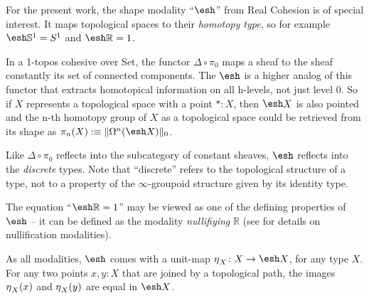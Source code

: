 \documentclass[9pt,twosided]{amsart}
\newcommand{\shape}{\ensuremath{\mathord{\raisebox{0.5pt}{\text{\rm\esh}}}}}
\newcommand{\bR}{\mathbb R}
\newcommand{\bS}{\mathbb S}
\begin{document}
For the present work, the shape modality ``$\shape$'' from Real Cohesion is of special interest.
It maps topological spaces to their \emph{homotopy type}, so for example $\shape \bS^{1} =\sphere{1}$ 
and $\shape \bR =1$.


In a 1-topos cohesive over Set, the functor $\Delta\circ\pi_0$ maps a sheaf to the sheaf constantly its set of connected components.
The $\shape$ is a higher analog of this functor that extracts homotopical information on all h-levels, not just level 0.
So if $X$ represents a topological space with a point $\ast: X$, 
then $\shape X$ is also pointed and the n-th homotopy group of $X$ as a topological space 
could be retrieved from its shape 
as $\pi_n(X):\equiv\trunc{0}{\Omega^n(\shape X)}$.

Like $\Delta\circ\pi_0$ reflects into the subcategory of constant sheaves, $\shape$ reflects into the \emph{discrete} types.
Note that ``discrete'' refers to the topological structure of a type, 
not to a property of the $\infty$-groupoid structure given by its identity type.

The equation ``$\shape \bR=1$'' may be viewed as one of the defining properties of $\shape$
-- it can be defined as the modality \emph{nullifiying} $\bR$ (see \cite[Section 2.3]{RijkeSpittersShulman} for details on nullification modalities).

As all modalities, $\shape$ comes with a unit-map $\modalunit_X\colon X \to \shape X$, for any type $X$.
For any two points $x,y: X$ that are joined by a topological path, 
the images ${\eta_{}}_X(x)$ and ${\eta_{}}_X(y)$ are equal in $\shape X$.
\end{document}
